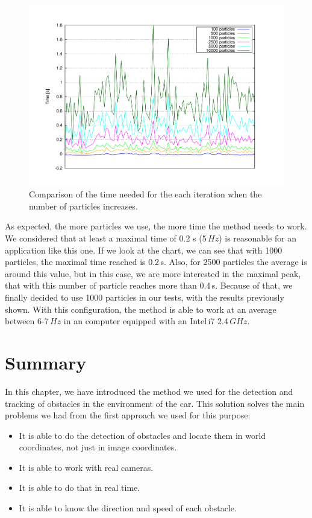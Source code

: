 \begin{figure}[th]
  \centering
  \includegraphics[trim=50 50 90 60, clip]{timesVsParticles}
  \caption{Comparison of the time needed for the each iteration when the number of particles increases.}\label{fig:cp05_time_vs_particles}
\end{figure}

As expected, the more particles we use, the more time the method needs to work. We considered that at least a maximal time of 0.2 s (5\,$Hz$) is reasonable for an application like this one. If we look at the chart, we can see that with 1000 particles, the maximal time reached is 0.2\,s. Also, for 2500 particles the average is around this value, but in this case, we are more interested in the maximal peak, that with this number of particle reaches more than 0.4\,s. Because of that, we finally decided to use 1000 particles in our tests, with the results previously shown. With this configuration, the method is able to work at an average between 6-7\,$Hz$ in an computer equipped with an Intel\textregistered\,i7 2.4\,$GHz$.
 
\section{Summary}\label{ch:chapter05_03}
 
In this chapter, we have introduced the method we used for the detection and tracking of obstacles in the environment of the car. This solution solves the main problems we had from the first approach we used for this purpose:
\begin{itemize}
 \item It is able to do the detection of obstacles and locate them in world coordinates, not just in image coordinates.
 \item It is able to work with real cameras.
 \item It is able to do that in real time.
 \item It is able to know the direction and speed of each obstacle.
\end{itemize}

